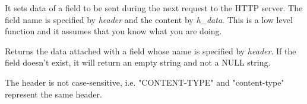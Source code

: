 


\label{wxhttpsetheader}


It sets data of a field to be sent during the next request to the HTTP server. The field
name is specified by {\it header} and the content by {\it h\_data}.
This is a low level function and it assumes that you know what you are doing.

\label{wxhttpgetheader}


Returns the data attached with a field whose name is specified by {\it header}.
If the field doesn't exist, it will return an empty string and not a NULL string.


The header is not case-sensitive, i.e. "CONTENT-TYPE" and "content-type" 
represent the same header.

